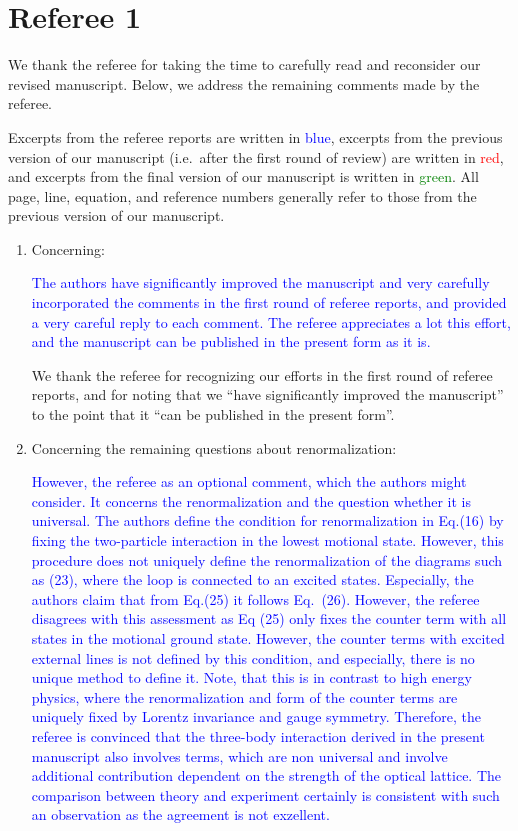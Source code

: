\documentclass[preprint,showkeys,nofootinbib]{revtex4-1}
\newcommand{\1}{\mathds{1}}
\newcommand{\blue}[1]{\textcolor{blue}{#1}}
\newcommand{\red}[1]{\textcolor{red}{#1}}
\newcommand{\green}[1]{\textcolor{green}{#1}}
\begin{document}
\section*{Referee 1}

We thank the referee for taking the time to carefully read and
reconsider our revised manuscript.  Below, we address the remaining
comments made by the referee.

Excerpts from the referee reports are written in \blue{blue}, excerpts
from the previous version of our manuscript (i.e.~after the first
round of review) are written in \red{red}, and excerpts from the final
version of our manuscript is written in \green{green}.  All page,
line, equation, and reference numbers generally refer to those from
the previous version of our manuscript.


\begin{enumerate}
\item Concerning:

  \blue{The authors have significantly improved the manuscript and
    very carefully incorporated the comments in the first round of
    referee reports, and provided a very careful reply to each
    comment. The referee appreciates a lot this effort, and the
    manuscript can be published in the present form as it is.}

  We thank the referee for recognizing our efforts in the first round
  of referee reports, and for noting that we ``have significantly
  improved the manuscript'' to the point that it ``can be published in
  the present form''.


\item Concerning the remaining questions about renormalization:

  \blue{However, the referee as an optional comment, which the authors
    might consider. It concerns the renormalization and the question
    whether it is universal. The authors define the condition for
    renormalization in Eq.(16) by fixing the two-particle interaction
    in the lowest motional state. However, this procedure does not
    uniquely define the renormalization of the diagrams such as (23),
    where the loop is connected to an excited states. Especially, the
    authors claim that from Eq.(25) it follows Eq.~(26). However, the
    referee disagrees with this assessment as Eq (25) only fixes the
    counter term with all states in the motional ground
    state. However, the counter terms with excited external lines is
    not defined by this condition, and especially, there is no unique
    method to define it. Note, that this is in contrast to high energy
    physics, where the renormalization and form of the counter terms
    are uniquely fixed by Lorentz invariance and gauge
    symmetry. Therefore, the referee is convinced that the three-body
    interaction derived in the present manuscript also involves terms,
    which are non universal and involve additional contribution
    dependent on the strength of the optical lattice. The comparison
    between theory and experiment certainly is consistent with such an
    observation as the agreement is not exzellent.}


\end{enumerate}
\end{document}
